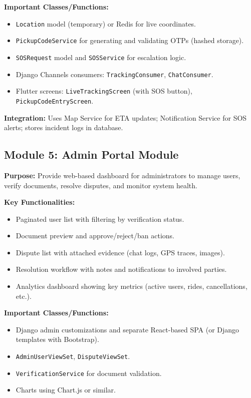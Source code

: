 \textbf{Important Classes/Functions:}
\begin{itemize}
    \item \texttt{Location} model (temporary) or Redis for live coordinates.
    \item \texttt{PickupCodeService} for generating and validating OTPs (hashed storage).
    \item \texttt{SOSRequest} model and \texttt{SOSService} for escalation logic.
    \item Django Channels consumers: \texttt{TrackingConsumer}, \texttt{ChatConsumer}.
    \item Flutter screens: \texttt{LiveTrackingScreen} (with SOS button), \texttt{PickupCodeEntryScreen}.
\end{itemize}

\textbf{Integration:} Uses Map Service for ETA updates; Notification Service for SOS alerts; stores incident logs in database.

\subsection{Module 5: Admin Portal Module}

\textbf{Purpose:} Provide web-based dashboard for administrators to manage users, verify documents, resolve disputes, and monitor system health.

\textbf{Key Functionalities:}
\begin{itemize}
    \item Paginated user list with filtering by verification status.
    \item Document preview and approve/reject/ban actions.
    \item Dispute list with attached evidence (chat logs, GPS traces, images).
    \item Resolution workflow with notes and notifications to involved parties.
    \item Analytics dashboard showing key metrics (active users, rides, cancellations, etc.).
\end{itemize}

\textbf{Important Classes/Functions:}
\begin{itemize}
    \item Django admin customizations and separate React-based SPA (or Django templates with Bootstrap).
    \item \texttt{AdminUserViewSet}, \texttt{DisputeViewSet}.
    \item \texttt{VerificationService} for document validation.
    \item Charts using Chart.js or similar.
\end{itemize}

